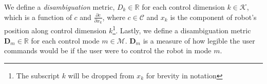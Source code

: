 \documentclass[conference]{IEEEtran}
\newcommand{\norm}[1]{\left\lVert#1\right\rVert}
\begin{document}
We define a \textit{disambiguation} metric, $D_{k}\in \mathbb{R}$ for each control dimension $k \in \mathcal{K}$, which is a function of $c$ and $\frac{\partial c}{\partial x_k}$, where $c \in \mathcal{C}$ and $x_k$ is the component of robot's position along control dimension $k$\footnote{The subscript $k$ will be dropped from $x_k$ for brevity in notation}. Lastly, we define a disambiguation metric $\boldsymbol{D}_m \in \mathbb{R}$ for each control mode $m \in \mathcal{M}$.
$\boldsymbol{D}_m$ is a measure of how legible the user commands would be if the user were to control the robot in mode $m$. 
\end{document}
